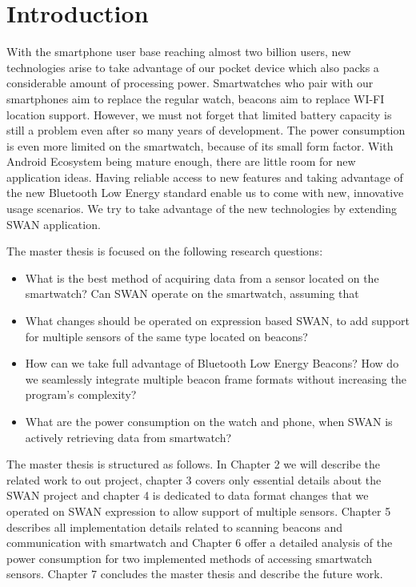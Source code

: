 
\chapter{Introduction} %

\label{Chapter1} %


With the smartphone user base reaching almost two billion users, new technologies arise to take advantage of our pocket device which also packs a considerable amount of processing power.
Smartwatches who pair with our smartphones aim to replace the regular watch, beacons aim to replace WI-FI location support. 
However, we must not forget that limited battery capacity is still a problem even after so many years of development. The power consumption is even more limited on the smartwatch, because of
its small form factor.
With Android Ecosystem being mature enough, there are little room for new application ideas. Having reliable access to new features and taking advantage of the new Bluetooth Low Energy standard
enable us to come with new, innovative usage scenarios. We try to take advantage of the new technologies by extending SWAN application.

The master thesis is focused on the following research questions:

\begin{itemize}
 \item What is the best method of acquiring data from a sensor located on the smartwatch? Can SWAN operate on the smartwatch, assuming that 
 \item What changes should be operated on expression based SWAN, to add support for multiple sensors of the same type located on beacons?
 \item How can we take full advantage of Bluetooth Low Energy Beacons? How do we seamlessly integrate multiple beacon frame formats without increasing the program's complexity?
 \item What are the power consumption on the watch and phone, when SWAN is actively retrieving data from smartwatch?
\end{itemize}

The master thesis is structured as follows. In Chapter 2 we will describe the related work to out project, chapter 3 covers only essential details about the SWAN project and chapter 4 is dedicated to 
data format changes that we operated on SWAN expression to allow support of multiple sensors. Chapter 5 describes all implementation details related to scanning beacons and communication
with smartwatch and Chapter 6 offer a detailed analysis of the power consumption for two implemented methods of accessing smartwatch sensors. Chapter 7 concludes the master thesis and describe 
the future work.
